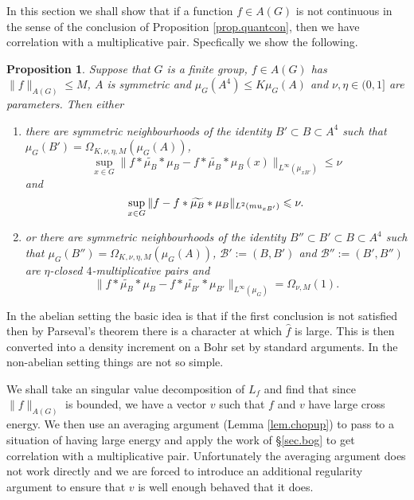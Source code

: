 \documentclass[12pt]{amsart}
\numberwithin{equation}{section}
\theoremstyle{plain}
\newtheorem{proposition}[subsection]{Proposition}
\theoremstyle{definition}
\renewcommand{\leq}{\leqslant}
\newcommand{\wh}{\widehat}
\begin{document}
 In this section we shall show that if a function $f \in A(G)$ is not continuous in the sense of the conclusion of Proposition \ref{prop.quantcon}, then we have correlation with a multiplicative pair.  Specfically we show the following. 
 \begin{proposition}\label{prop.disc2}
Suppose that $G$ is a finite group, $f \in A(G)$ has $\|f\|_{A(G)} \leq M$, $A$ is symmetric and $\mu_G(A^4) \leq K\mu_G(A)$ and $\nu,\eta \in (0,1]$ are parameters.  Then either
\begin{enumerate}
\item there are symmetric neighbourhoods of the identity $B' \subset B \subset A^4$ such that $\mu_G(B')=\Omega_{K,\nu,\eta,M}(\mu_G(A))$,
\begin{equation*}
\sup_{x \in G}{\|f\ast\widetilde{\mu_B}\ast  \mu_B-f\ast\widetilde{\mu_B}\ast  \mu_B(x)\|_{L^\infty(\mu_{xB'})}}\leq \nu
\end{equation*}
and
\begin{equation*}
\sup_{x \in G}{\|f - f\ast\widetilde{\mu_B}\ast  \mu_B\|_{L^2(\\mu_{xB'})}}\leq \nu.
\end{equation*}
\item or there are symmetric neighbourhoods of the identity $B''\subset B' \subset B \subset A^4$ such that  $\mu_G(B'')=\Omega_{K,\nu,\eta,M}(\mu_G(A))$, $\mathcal{B}':=(B,B')$ and $\mathcal{B}'':=(B',B'')$ are $\eta$-closed $4$-multiplicative pairs and
\begin{equation*}
\|f \ast \widetilde{\mu_B}\ast  \mu_B - f \ast \widetilde{\mu_{B'}}\ast  \mu_{B'}\|_{L^\infty(\mu_G)}= \Omega_{\nu,M}(1).
\end{equation*}
\begin{equation*}
\end{equation*}
\end{enumerate}
\end{proposition}
In the abelian setting the basic idea is that if the first conclusion is not satisfied then by Parseval's theorem there is a character at which $\wh{f}$ is large.  This is then converted into a density increment on a Bohr set by standard arguments.  In the non-abelian setting things are not so simple.

We shall take an singular value decomposition of $L_f$ and find that since $\|f\|_{A(G)}$ is bounded, we have a vector $v$ such that $f$ and $v$ have large cross energy.  We then use an averaging argument (Lemma \ref{lem.chopup}) to pass to a situation of having large energy and apply the work of \S\ref{sec.bog} to get correlation with a multiplicative pair. Unfortunately the averaging argument does not work directly and we are forced to introduce an additional regularity argument to ensure that $v$ is well enough behaved that it does.
\end{document}
